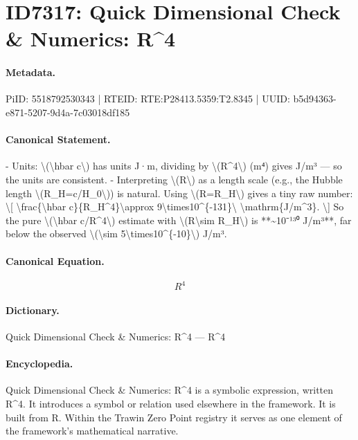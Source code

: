 \section*{ID7317: Quick Dimensional Check \& Numerics: R\textasciicircum{}4}
\paragraph{Metadata.}
PiID: 5518792530343 | RTEID: RTE:P28413.5359:T2.8345 | UUID: b5d94363-e871-5207-9d4a-7c03018df185

\paragraph{Canonical Statement.}
- Units: \textbackslash{}(\textbackslash{}hbar c\textbackslash{}) has units J·m, dividing by \textbackslash{}(R\textasciicircum{}4\textbackslash{}) (m⁴) gives J/m³ — so the units are consistent. - Interpreting \textbackslash{}(R\textbackslash{}) as a length scale (e.g., the Hubble length \textbackslash{}(R\_H=c/H\_0\textbackslash{})) is natural. Using \textbackslash{}(R=R\_H\textbackslash{}) gives a tiny raw number: \textbackslash{}[ \textbackslash{}frac\{\textbackslash{}hbar c\}\{R\_H\textasciicircum{}4\}\textbackslash{}approx 9\textbackslash{}times10\textasciicircum{}\{-131\}\textbackslash{} \textbackslash{}mathrm\{J/m\textasciicircum{}3\}. \textbackslash{}] So the pure \textbackslash{}(\textbackslash{}hbar c/R\textasciicircum{}4\textbackslash{}) estimate with \textbackslash{}(R\textbackslash{}sim R\_H\textbackslash{}) is **\textasciitilde{}10⁻¹³⁰ J/m³**, far below the observed \textbackslash{}(\textbackslash{}sim 5\textbackslash{}times10\textasciicircum{}\{-10\}\textbackslash{}) J/m³.

\paragraph{Canonical Equation.}
\[
R^4
\]

\paragraph{Dictionary.}
Quick Dimensional Check \& Numerics: R\textasciicircum{}4 — R\textasciicircum{}4

\paragraph{Encyclopedia.}
Quick Dimensional Check \& Numerics: R\textasciicircum{}4 is a symbolic expression, written R\textasciicircum{}4. It introduces a symbol or relation used elsewhere in the framework. It is built from R. Within the Trawin Zero Point registry it serves as one element of the framework's mathematical narrative.
